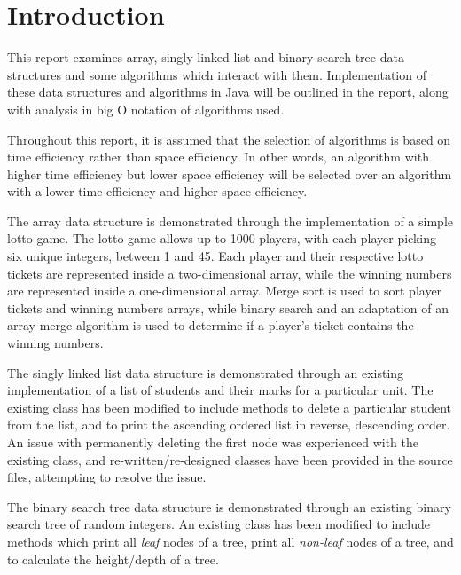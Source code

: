 \section{Introduction}

This report examines array, singly linked list and binary search tree data structures and some algorithms which interact with them. Implementation of these data structures and algorithms in Java will be outlined in the report, along with analysis in big O notation of algorithms used. 

Throughout this report, it is assumed that the selection of algorithms is based on time efficiency rather than space efficiency. In other words, an algorithm with higher time efficiency but lower space efficiency will be selected over an algorithm with a lower time efficiency and higher space efficiency.

The array data structure is demonstrated through the implementation of a simple lotto game. The lotto game allows up to 1000 players, with each player picking six unique integers, between 1 and 45. Each player and their respective lotto tickets are represented inside a two-dimensional array, while the winning numbers are represented inside a one-dimensional array. Merge sort is used to sort player tickets and winning numbers arrays, while binary search and an adaptation of an array merge algorithm is used to determine if a player's ticket contains the winning numbers.

The singly linked list data structure is demonstrated through an existing implementation of a list of students and their marks for a particular unit. The existing class has been modified to include methods to delete a particular student from the list, and to print the ascending ordered list in reverse, descending order. An issue with permanently deleting the first node was experienced with the existing class, and re-written/re-designed classes have been provided in the source files, attempting to resolve the issue.

The binary search tree data structure is demonstrated through an existing binary search tree of random integers. An existing class has been modified to include methods which print all \emph{leaf} nodes of a tree, print all \emph{non-leaf} nodes of a tree, and to calculate the height/depth of a tree.